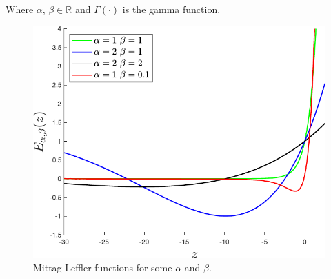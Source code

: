 Where $\alpha,\,\beta\in\mathbb{R}$ and $\Gamma(\cdot)$ is the gamma function. 

\begin{figure}[H]
    \centering
    \includegraphics[scale=0.5]{files/mittag.pdf}
    \caption{Mittag-Leffler functions for some $\alpha$ and $\beta$.}
    \label{fig:mittag}
\end{figure}
